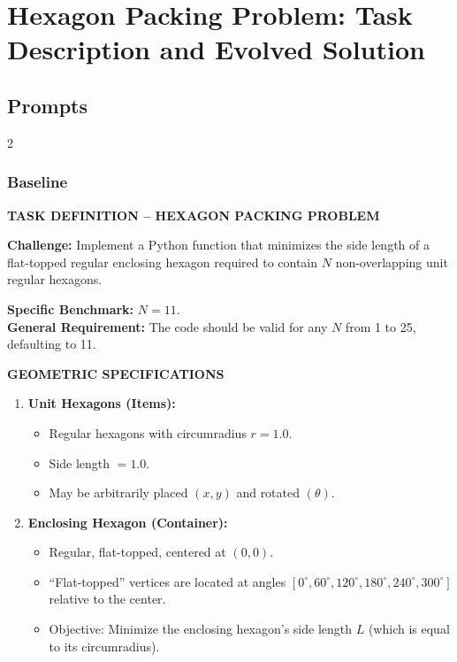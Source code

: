 \documentclass[sigconf]{acmart}
\begin{document}
\newpage
\appendix
{}

\onecolumn
\section{Hexagon Packing Problem: Task Description and Evolved Solution}
\label{sec:hexagons_expanded}

\subsection{Prompts}
\begin{paracol}{2}
\subsubsection{Baseline}

\noindent \textbf{TASK DEFINITION -- HEXAGON PACKING PROBLEM}

\vspace{0.3cm}
\noindent \textbf{Challenge:} Implement a Python function that minimizes the side length of a flat-topped regular enclosing hexagon required to contain $N$ non-overlapping unit regular hexagons.

\vspace{0.3cm}
\noindent \textbf{Specific Benchmark:} $N=11$.\\
\textbf{General Requirement:} The code should be valid for any $N$ from 1 to 25, defaulting to 11.

\vspace{0.3cm}
\noindent \textbf{GEOMETRIC SPECIFICATIONS}
\begin{enumerate}
    \item \textbf{Unit Hexagons (Items):}
    \begin{itemize}
        \item Regular hexagons with circumradius $r = 1.0$.
        \item Side length $= 1.0$.
        \item May be arbitrarily placed $(x, y)$ and rotated $(\theta)$.
    \end{itemize}
    \item \textbf{Enclosing Hexagon (Container):}
    \begin{itemize}
        \item Regular, flat-topped, centered at $(0,0)$.
        \item ``Flat-topped'' vertices are located at angles $[0^\circ, \allowbreak 60^\circ, \allowbreak 120^\circ, \allowbreak 180^\circ, \allowbreak 240^\circ, \allowbreak 300^\circ]$ relative to the center.
        \item Objective: Minimize the enclosing hexagon's side length $L$ (which is equal to its circumradius).
    \end{itemize}
\end{enumerate}


\end{paracol}
\end{document}
